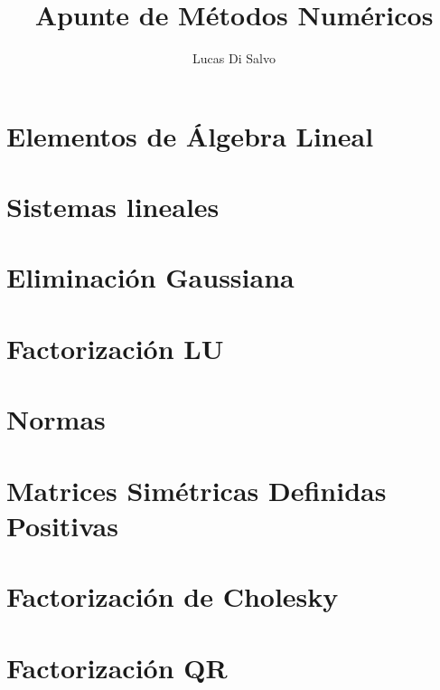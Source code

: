 \documentclass[a4paper]{article}
\title{Apunte de Métodos Numéricos}
\author{Lucas Di Salvo}
\begin{document}
\maketitle

\thispagestyle{empty}
\vspace{1cm}
{
\hypersetup{linkcolor = black}
\tableofcontents
}
\newpage

\thispagestyle{empty}
\vspace{1cm}
\renewcommand*\listalgorithmname{Lista de Algoritmos}
{
\hypersetup{linkcolor = black}
\listofalgorithms}
\newpage

\section{Elementos de Álgebra Lineal}\label{section:elementos_de_algebra_lineal}

\newpage

\section{Sistemas lineales}\label{section:sistemas_lineales}

\newpage

\section{Eliminación Gaussiana}\label{section:eliminacion_gaussiana}

\newpage

\section{Factorización LU}\label{section:factorizacion_lu}

\newpage

\section{Normas}\label{section:normas}

\newpage

\section{Matrices Simétricas Definidas Positivas}\label{section:matrices_sdp}

\newpage

\section{Factorización de Cholesky}\label{section:factorizacion_de_cholesky}

\newpage

\section{Factorización QR}\label{section:factorizacon_qr}

\newpage
\end{document}
